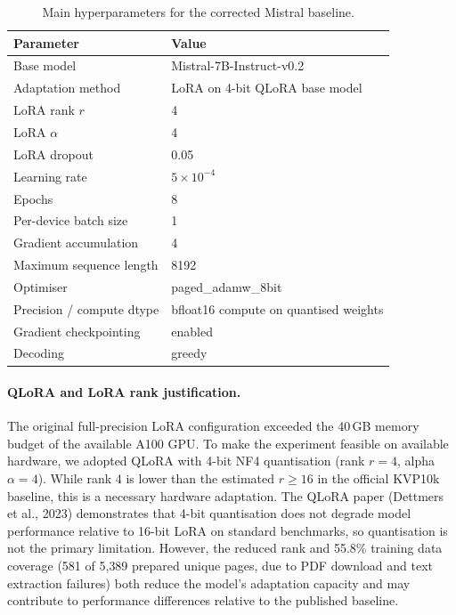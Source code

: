 \begin{table}[h]
  \centering
  \caption{Main hyperparameters for the corrected Mistral baseline.}
  \label{tab:mistral-hyperparams}
  \begin{tabular}{ll}
    \hline
    \textbf{Parameter} & \textbf{Value} \\
    \hline
    Base model & Mistral-7B-Instruct-v0.2 \\
    Adaptation method & LoRA on 4-bit QLoRA base model \\
    LoRA rank $r$ & 4 \\
    LoRA $\alpha$ & 4 \\
    LoRA dropout & 0.05 \\
    Learning rate & $5 \times 10^{-4}$ \\
    Epochs & 8 \\
    Per-device batch size & 1 \\
    Gradient accumulation & 4 \\
    Maximum sequence length & 8192 \\
    Optimiser & paged\_adamw\_8bit \\
    Precision / compute dtype & bfloat16 compute on quantised weights \\
    Gradient checkpointing & enabled \\
    Decoding & greedy \\
    \hline
  \end{tabular}
\end{table}

\paragraph{QLoRA and LoRA rank justification.}
The original full-precision LoRA configuration exceeded the 40\,GB memory
budget of the available A100 GPU. To make the experiment feasible on available
hardware, we adopted QLoRA with 4-bit NF4 quantisation (rank $r = 4$,
alpha $\alpha = 4$). While rank 4 is lower than the estimated $r \geq 16$ in
the official KVP10k baseline, this is a necessary hardware adaptation. The
QLoRA paper (Dettmers et al., 2023) demonstrates that 4-bit quantisation does
not degrade model performance relative to 16-bit LoRA on standard benchmarks,
so quantisation is not the primary limitation. However, the reduced rank and
55.8\% training data coverage (581 of 5{,}389 prepared unique pages, due to
PDF download and text extraction failures) both reduce the model's adaptation
capacity and may contribute to performance differences relative to the
published baseline.

